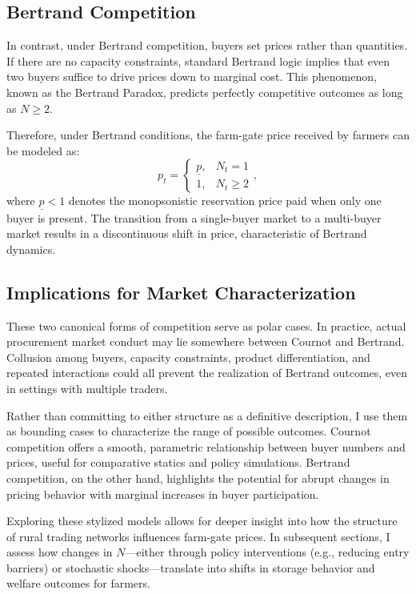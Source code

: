\subsection{Bertrand Competition}
\noindent In contrast, under Bertrand competition, buyers set prices rather than quantities. If there are no capacity constraints, standard Bertrand logic implies that even two buyers suffice to drive prices down to marginal cost. This phenomenon, known as the Bertrand Paradox, predicts perfectly competitive outcomes as long as $N \geq 2$.

Therefore, under Bertrand conditions, the farm-gate price received by farmers can be modeled as:
\begin{equation}
p_t = 
\begin{cases}
\underline{p}, & N_t = 1 \\
1, & N_t \geq 2
\end{cases},
\end{equation}
\noindent where $\underline{p} < 1$ denotes the monopsonistic reservation price paid when only one buyer is present. The transition from a single-buyer market to a multi-buyer market results in a discontinuous shift in price, characteristic of Bertrand dynamics.

\subsection{Implications for Market Characterization}

\noindent These two canonical forms of competition serve as polar cases. In practice, actual procurement market conduct may lie somewhere between Cournot and Bertrand. Collusion among buyers, capacity constraints, product differentiation, and repeated interactions could all prevent the realization of Bertrand outcomes, even in settings with multiple traders.

Rather than committing to either structure as a definitive description, I use them as bounding cases to characterize the range of possible outcomes. Cournot competition offers a smooth, parametric relationship between buyer numbers and prices, useful for comparative statics and policy simulations. Bertrand competition, on the other hand, highlights the potential for abrupt changes in pricing behavior with marginal increases in buyer participation.

Exploring these stylized models allows for deeper insight into how the structure of rural trading networks influences farm-gate prices. In subsequent sections, I assess how changes in $N$—either through policy interventions (e.g., reducing entry barriers) or stochastic shocks—translate into shifts in storage behavior and welfare outcomes for farmers.





